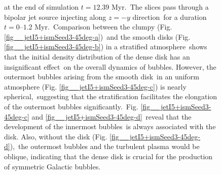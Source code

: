 \documentclass[fleqn,usenatbib,useAMS]{mnras}
\begin{document}
\begin{figure}
{             at the end of simulation $t=12.39$ Myr.\
             The slices pass through a bipolar jet source injecting along $z=-y$ direction\
             for a duration $t=0$--$1.2$ Myr.\
             Comparison between the clumpy (Fig. \ref{fig__jetI5+ismSeed3-45deg-a})\
             and the smooth disks (Fig. \ref{fig__jetI5+ismSeed3-45deg-b}) in a stratified atmosphere\
             shows that the initial density distribution of the dense disk has an insignificant effect\
             on the overall dynamics of bubbles. However, the outermost bubbles arising from the smooth disk\
             in an uniform atmosphere (Fig. \ref{fig__jetI5+ismSeed3-45deg-c}) is nearly spherical,\
             suggesting that the stratification facilitates the elongation of the outermost bubbles significantly.\
             Fig. \ref{fig__jetI5+ismSeed3-45deg-c} and \ref{fig__jetI5+ismSeed3-45deg-d}\
             reveal that the development of the innermost bubbles\
             is always associated with the disk. Also, without the disk (Fig. \ref{fig__jetI5+ismSeed3-45deg-d}),\
             the outermost bubbles and the turbulent plasma would be oblique,
             indicating that the dense disk is crucial for the production of symmetric Galactic bubbles.\ %
      }
      \label{fig__jetI5+ismSeed3-45deg}
 \end{figure}%
\end{document}
